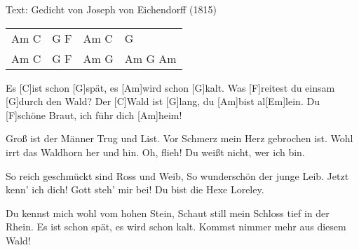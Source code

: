 {\color{gray}Text: Gedicht von Joseph von Eichendorff {\small(1815)}}


\begin{guitar} 
	{\footnotesize\begin{tabular}{|l|l|l|l|}
		Am C & G F & Am C & G \\
		Am C & G F & Am G & Am G Am
	\end{tabular}}
	
	Es [C]ist schon [G]spät, es [Am]wird schon [G]kalt.
	Was [F]reitest du einsam [G]durch den Wald?
	Der [C]Wald ist [G]lang, du [Am]bist al[Em]lein.
	Du [F]schöne Braut, ich führ dich [Am]heim!
	
	
	Groß ist der Männer Trug und List.
	Vor Schmerz mein Herz gebrochen ist.
	Wohl irrt das Waldhorn her und hin.
	Oh, flieh! Du weißt nicht, wer ich bin.
	
	
	So reich geschmückt sind Ross und Weib,
	So wunderschön der junge Leib.
	Jetzt kenn' ich dich! Gott steh' mir bei!
	Du bist die Hexe Loreley.
	
	
	Du kennst mich wohl vom hohen Stein,
	Schaut still mein Schloss tief in der Rhein.
	Es ist schon spät, es wird schon kalt.
	Kommst nimmer mehr aus diesem Wald!
	
	 
\end{guitar}